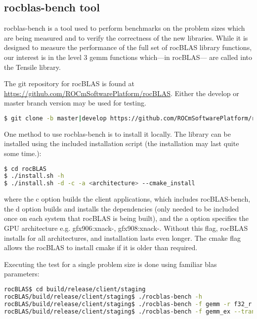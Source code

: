 \documentclass[]{article}
\begin{document}
\subsection{rocblas-bench tool}

\label{sec:bench}

\noindent
rocblas-bench is a tool used to perform benchmarks on the problem sizes which are being measured and to verify the correctness of the new libraries. While it is designed to measure the performance of the full set of rocBLAS library functions, our interest is in the level 3 gemm functions which---in rocBLAS--- are called into the Tensile library. 


The git repository for rocBLAS is found at \url{https://github.com/ROCmSoftwarePlatform/rocBLAS}. Either the develop or master branch version may be used for testing.

\begin{lstlisting}[language=bash]
$ git clone -b master|develop https://github.com/ROCmSoftwarePlatform/rocBLAS.git
\end{lstlisting}

One method to use rocblas-bench is to install it locally. The library can be installed using the included installation script (the installation may last quite some time.):

\begin{lstlisting}[language=bash]
$ cd rocBLAS
$ ./install.sh -h
$ ./install.sh -d -c -a <architecture> --cmake_install
\end{lstlisting}

\noindent
where the c option builds the client applications, which includes rocBLAS-bench, the d option builds and installs the dependencies (only needed to be included once on each system that rocBLAS is being built), and the a option specifies the GPU architecture e.g. gfx906:xnack-, gfx908:xnack-. Without this flag, rocBLAS installs for all architectures, and installation lasts even longer. The cmake flag allows the rocBLAS to install cmake if it is older than required.

\noindent
Executing the test for a single problem size is done using familiar blas parameters:

\begin{lstlisting}[language=bash]
rocBLAS$ cd build/release/client/staging
rocBLAS/build/release/client/staging$ ./rocblas-bench -h
rocBLAS/build/release/client/staging$ ./rocblas-bench -f gemm -r f32_r --transposeA N --transposeB T -m 1001 -n 1536 -k 64 --alpha 1.0 --lda 1001 --ldb 1536 --beta 0.0 --ldc 1001 -i 10
rocBLAS/build/release/client/staging$ ./rocblas-bench -f gemm_ex --transposeA N --transposeB T -m 1024 -n 1024-k 1024 --a_type h --lda 2048 --b_type h --ldb 2048 --beta 1 --c_type s --ldc 2048 --d_type s --ldd 2048 --compute_type s -v 1 --iters 10 --cold_iters 2
\end{lstlisting}
\end{document}
